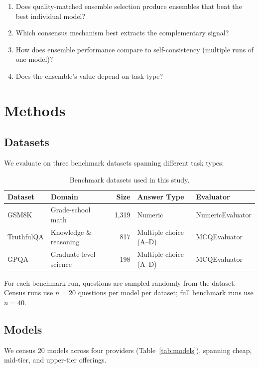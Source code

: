 \documentclass[11pt,a4paper]{article}
\begin{document}
\begin{enumerate}
    \item Does quality-matched ensemble selection produce ensembles that beat the best individual model?
    \item Which consensus mechanism best extracts the complementary signal?
    \item How does ensemble performance compare to self-consistency (multiple runs of one model)?
    \item Does the ensemble's value depend on task type?
\end{enumerate}

\section{Methods}
\label{sec:methods}

\subsection{Datasets}

We evaluate on three benchmark datasets spanning different task types:

\begin{table}[htbp]
\centering
\caption{Benchmark datasets used in this study.}
\label{tab:datasets}
\begin{tabular}{llrll}
\toprule
\textbf{Dataset} & \textbf{Domain} & \textbf{Size} & \textbf{Answer Type} & \textbf{Evaluator} \\
\midrule
GSM8K & Grade-school math & 1,319 & Numeric & NumericEvaluator \\
TruthfulQA & Knowledge \& reasoning & 817 & Multiple choice (A--D) & MCQEvaluator \\
GPQA & Graduate-level science & 198 & Multiple choice (A--D) & MCQEvaluator \\
\bottomrule
\end{tabular}
\end{table}

For each benchmark run, questions are sampled randomly from the dataset.
Census runs use $n=20$ questions per model per dataset; full benchmark runs use $n=40$.

\subsection{Models}

We census 20 models across four providers (Table~\ref{tab:models}), spanning cheap, mid-tier, and upper-tier offerings.
\end{document}
